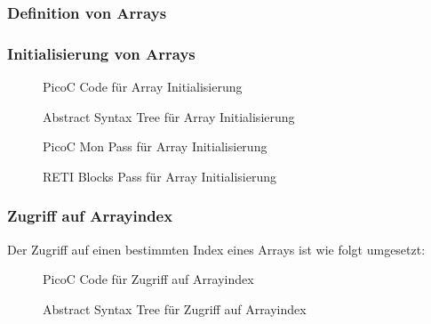 \subsubsection{Definition von Arrays}

\subsubsection{Initialisierung von Arrays}
\begin{figure}[H]
  \centering
  \caption{PicoC Code für Array Initialisierung}
  \label{fig:picoc_code_für_array_initialisierung}
\end{figure}

\begin{figure}[H]
  \centering
  \caption{Abstract Syntax Tree für Array Initialisierung}
  \label{fig:abstract_syntax_tree_für_array_initialisierung}
\end{figure}

\begin{figure}[H]
  \centering
  \caption{PicoC Mon Pass für Array Initialisierung}
  \label{fig:picoc_mon_für_array_initialisierung}
\end{figure}

\begin{figure}[H]
  \centering
  \caption{RETI Blocks Pass für Array Initialisierung}
  \label{fig:reti_blocks_für_array_initialisierung}
\end{figure}


\subsubsection{Zugriff auf Arrayindex}
Der Zugriff auf einen bestimmten  Index eines Arrays ist wie folgt umgesetzt:

\begin{figure}[H]
  \centering
  \caption{PicoC Code für Zugriff auf Arrayindex}
  \label{fig:picoc_code_für_zugriff_auf_arrayindex}
\end{figure}

\begin{figure}[H]
  \centering
  \caption{Abstract Syntax Tree für Zugriff auf Arrayindex}
  \label{fig:abstract_syntax_tree_für_zugriff_auf_arrayindex}
\end{figure}

